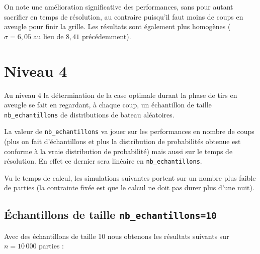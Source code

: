 On note une amélioration significative des performances, sans pour autant sacrifier en temps de résolution, au contraire puisqu'il faut moins de coups en aveugle pour finir la grille. Les résultats sont également plus homogènes ($\sigma=6,05$ au lieu de $8,41$ précédemment).

\newpage
\section{Niveau 4}
Au niveau 4 la détermination de la case optimale durant la phase de tirs en aveugle se fait en regardant, à chaque coup, un échantillon de taille \texttt{nb\_echantillons} de distributions de bateau aléatoires.

La valeur de \texttt{nb\_echantillons} va jouer sur les performances en nombre de coups (plus on fait d'échantillons et plus la distribution de probabilités obtenue est conforme à la vraie distribution de probabilité) mais aussi sur le temps de résolution. En effet ce dernier sera linéaire en \texttt{nb\_echantillons}.

Vu le temps de calcul, les simulations suivantes portent sur un nombre plus faible de parties (la contrainte fixée est que le calcul ne doit pas durer plus d'une nuit).
\subsection{Échantillons de taille \texttt{nb\_echantillons=10}}
Avec des échantillons de taille 10 nous obtenons les résultats suivants sur $n=10\,000$ parties :

\begin{center}
\end{center}

